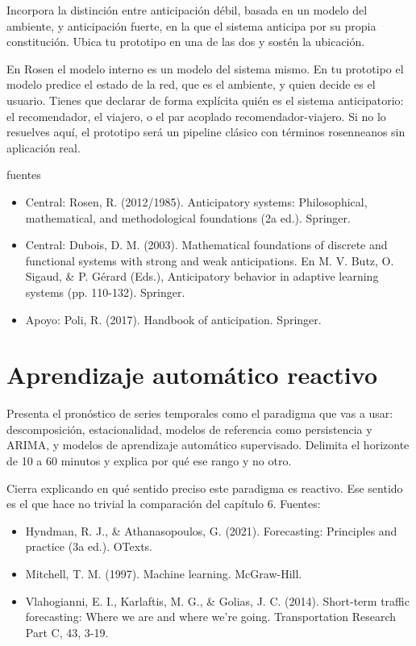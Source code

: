 \documentclass[letterpaper,12pt,oneside]{book}
\theoremstyle{definition}
\theoremstyle{plain}
\theoremstyle{remark}
\begin{document}
Incorpora la distinción entre anticipación débil, basada en un modelo del ambiente, y anticipación fuerte, en la que el sistema anticipa por su propia constitución. Ubica tu prototipo en una de las dos y sostén la ubicación.

En Rosen el modelo interno es un modelo del sistema mismo. En tu prototipo el modelo predice el estado de la red, que es el ambiente, y quien decide es el usuario. Tienes que declarar de forma explícita quién es el sistema anticipatorio: el recomendador, el viajero, o el par acoplado recomendador-viajero. Si no lo resuelves aquí, el prototipo será un pipeline clásico con términos rosenneanos sin aplicación real.


fuentes

\begin{itemize}
    \item Central: Rosen, R. (2012/1985). Anticipatory systems: Philosophical, mathematical, and methodological foundations (2a ed.). Springer.
    \item Central: Dubois, D. M. (2003). Mathematical foundations of discrete and functional systems with strong and weak anticipations. En M. V. Butz, O. Sigaud, \& P. Gérard (Eds.), Anticipatory behavior in adaptive learning systems (pp. 110-132). Springer. 
    \item Apoyo: Poli, R. (2017). Handbook of anticipation. Springer.
\end{itemize}
\section{Aprendizaje automático reactivo}
Presenta el pronóstico de series temporales como el paradigma que vas a usar: descomposición, estacionalidad, modelos de referencia como persistencia y ARIMA, y modelos de aprendizaje automático supervisado. Delimita el horizonte de 10 a 60 minutos y explica por qué ese rango y no otro.

Cierra explicando en qué sentido preciso este paradigma es reactivo. Ese sentido es el que hace no trivial la comparación del capítulo 6.
Fuentes:

\begin{itemize}
    \item Hyndman, R. J., \& Athanasopoulos, G. (2021). Forecasting: Principles and practice (3a ed.). OTexts.
    \item Mitchell, T. M. (1997). Machine learning. McGraw-Hill.
    \item Vlahogianni, E. I., Karlaftis, M. G., \& Golias, J. C. (2014). Short-term traffic forecasting: Where we are and where we're going. Transportation Research Part C, 43, 3-19.
\end{itemize}
\end{document}

